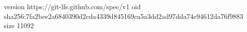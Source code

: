 version https://git-lfs.github.com/spec/v1
oid sha256:7fa2bee2a6840390d2cda4339d845169ca5a3dd2ad97dda74e94612da76f9883
size 11092
